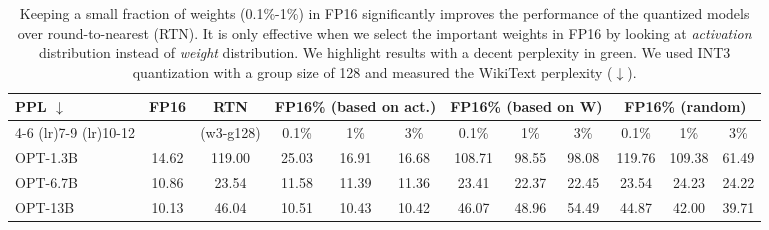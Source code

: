 \renewcommand \arraystretch{1.05}
\begin{table}[t]
    \setlength{\tabcolsep}{4.5pt}
    \small
    \centering
    \vspace{5pt}
    \begin{tabular}{lccccccccccc}
        \toprule
          \multirow{2}{*}{\textbf{PPL $\downarrow$}}   & \multirow{2}{*}{FP16} & \multirow{2}{*}{RTN}   & \multicolumn{3}{c}{FP16\% (based on act.)}  & \multicolumn{3}{c}{FP16\% (based on W)} &  \multicolumn{3}{c}{FP16\% (random)} \\ \cmidrule(lr){4-6} \cmidrule(lr){7-9}  \cmidrule(lr){10-12}
         & & (w3-g128) & 0.1\% & 1\% & 3\% &   0.1\% & 1\% & 3\% &  0.1\% & 1\% & 3\%   \\
        \midrule
        OPT-1.3B  & 14.62 & 119.00 & 25.03 & \textcolor{codegreen}{16.91} & \textcolor{codegreen}{16.68} & 108.71 & 98.55 & 98.08 & 119.76 & 109.38 & 61.49 \\
        OPT-6.7B & 10.86 & 23.54 & \textcolor{codegreen}{11.58} & \textcolor{codegreen}{11.39} & \textcolor{codegreen}{11.36} & 23.41 & 22.37 & 22.45 & 23.54 & 24.23 & 24.22 \\
        OPT-13B &  10.13 & 46.04 &\textcolor{codegreen}{10.51} & \textcolor{codegreen}{10.43} & \textcolor{codegreen}{10.42} & 46.07 & 48.96 & 54.49 & 44.87 & 42.00 & 39.71 \\
        \bottomrule
    \end{tabular}
    \caption{Keeping a small fraction of weights (0.1\%-1\%) in FP16 significantly improves the performance of the quantized models over round-to-nearest (RTN). It is only effective when we select the important weights in FP16 by looking at \emph{activation} distribution instead of \emph{weight} distribution. We highlight results with a decent perplexity in \textcolor{codegreen}{green}.  
    We used INT3 quantization with a group size of 128 and measured the WikiText perplexity ($\downarrow$).  
    } 
    \label{tab:fp_ratio}
\end{table}

